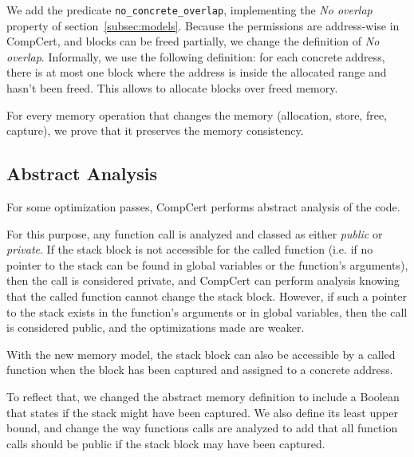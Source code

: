We add the predicate \texttt{no\_concrete\_overlap}, implementing the \textit{No overlap} property of section~\ref{subsec:models}. Because the permissions are address-wise in CompCert, and blocks can be freed partially, we change the definition of \textit{No overlap}. Informally, we use the following definition: for each concrete address, there is at most one block where the address is inside the allocated range and hasn't been freed. This allows to allocate blocks over freed memory.

For every memory operation that changes the memory (allocation, store, free, capture), we prove that it preserves the memory consistency.

\subsection{Abstract Analysis}

For some optimization passes, CompCert performs abstract analysis of the code.

For this purpose, any function call is analyzed and classed as either \textit{public} or \textit{private}. If the stack block is not accessible for the called function (i.e. if no pointer to the stack can be found in global variables or the function's arguments), then the call is considered private, and CompCert can perform analysis knowing that the called function cannot change the stack block. However, if such a pointer to the stack exists in the function's arguments or in global variables, then the call is considered public, and the optimizations made are weaker.

With the new memory model, the stack block can also be accessible by a called function when the block has been captured and assigned to a concrete address.

To reflect that, we changed the abstract memory definition to include a Boolean that states if the stack might have been captured. We also define its least upper bound, and change the way functions calls are analyzed to add that all function calls should be public if the stack block may have been captured.
